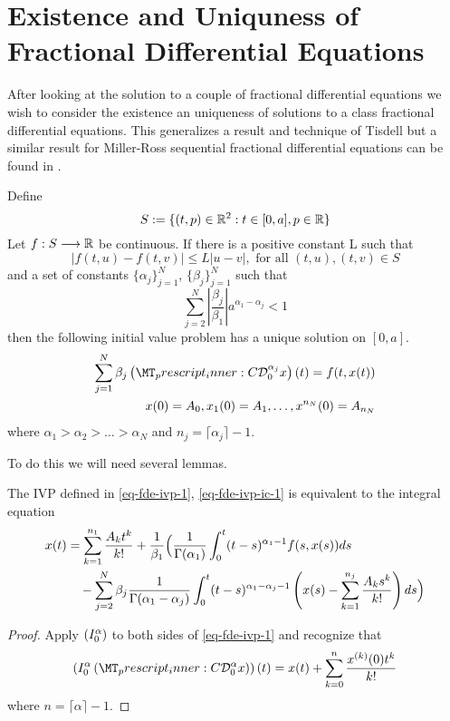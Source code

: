 \documentclass{unswmaths}
\begin{document}
\section*{Existence and Uniquness of Fractional Differential Equations}

After looking at the solution to a couple of fractional differential equations 
we wish to consider the existence an uniqueness of solutions to a class fractional differential equations. 
This generalizes a result and technique of Tisdell \cite{Tisdell2012} but a similar result for Miller-Ross sequential
fractional differential equations can be found in \cite{Podlubny1999}.


\begin{theorem}
\label{thm-existence-uniq}
	Define
		$$ S:= \{ (t,p) \in \mathbb{R}^2 : t \in [0, a], p \in \mathbb{R} \} $$
	Let $ f : S \longrightarrow \mathbb{R} $ be continuous. If there is a positive constant L such that 
		$$ |f(t,u) - f(t,v)| \leq L|u-v|, \text{ for all } (t,u), (t,v) \in S $$
	and a set of constants $ \{ \alpha_j \}_{j = 1}^{N} $, $ \{ \beta_j \}_{j=1}^N $
	such that
	$$
		\sum_{j=2}^N \left|\frac{\beta_j}{\beta_1}\right| a^{\alpha_1 - \alpha_j} < 1
	$$
	then the following initial value problem has a unique solution on $ [0, a] $.
	\begin{align}
		\label{eq-fde-ivp-1}
		\sum_{j=1}^{N} \beta_j\capder{0}{\alpha_j}{x}(t) = f(t,x(t)) \\
		\label{eq-fde-ivp-ic-1}
		x(0) = A_0, x_1(0) = A_1, \ldots, x^{n_N}(0) = A_{n_N}
	\end{align}
	where $ \alpha_1 > \alpha_2 > \ldots > \alpha_N $
	and $ n_j = \lceil \alpha_j \rceil - 1 $.
\end{theorem}
To do this we will need several lemmas. 

\begin{lemma}
	The IVP defined in \eqref{eq-fde-ivp-1}, \eqref{eq-fde-ivp-ic-1} is equivalent to the integral equation
	\begin{align*}
		x(t) &= \sum_{k=1}^{n_1}\frac{A_kt^k}{k!} + \frac{1}{\beta_1} \Bigl( \frac{1}{\Gamma(\alpha_1)}\int_{0}^{t} (t-s)^{\alpha_1 - 1}f(s,x(s))ds \\
			& \ \ \ - \sum_{j=2}^{N}\beta_j \frac{1}{\Gamma(\alpha_1 - \alpha_j)}
			\int_{0}^{t}(t-s)^{\alpha_1 - \alpha_j - 1}\left(x(s) - \sum_{k=1}^{n_j}\frac{A_ks^k}{k!} \right) ds \Bigr)
	\end{align*}
\end{lemma}
\begin{proof}
	Apply $ \left( I_{0}^{\alpha}  \right) $ to both sides of \eqref{eq-fde-ivp-1} and recognize that
	$$
		\rli{0}{\alpha}{\capder{0}{\alpha}{x}}(t) = x(t) + \sum_{k=0}^{n} \frac{x^{(k)}(0)t^{k}}{k!}
	$$
	where $ n = \lceil \alpha \rceil - 1 $.
\end{proof}
\end{document}
